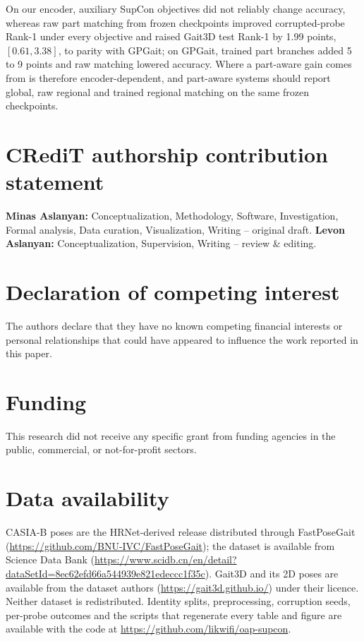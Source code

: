 \documentclass[review,12pt]{elsarticle}
\begin{document}
On our encoder, auxiliary SupCon objectives did not reliably change accuracy,
whereas raw part matching from frozen checkpoints improved corrupted-probe
Rank-1 under every objective and raised Gait3D test Rank-1 by 1.99 points,
$[0.61,3.38]$, to parity with GPGait; on GPGait, trained part branches added 5 to
9 points and raw matching lowered accuracy. Where a part-aware gain comes from
is therefore encoder-dependent, and part-aware systems should report global,
raw regional and trained regional matching on the same frozen checkpoints.

\section*{CRediT authorship contribution statement}
\textbf{Minas Aslanyan:} Conceptualization, Methodology, Software, Investigation,
Formal analysis, Data curation, Visualization, Writing -- original draft.
\textbf{Levon Aslanyan:} Conceptualization, Supervision, Writing -- review \&
editing.

\section*{Declaration of competing interest}
The authors declare that they have no known competing financial interests or
personal relationships that could have appeared to influence the work reported
in this paper.

\section*{Funding}
This research did not receive any specific grant from funding agencies in the
public, commercial, or not-for-profit sectors.

\section*{Data availability}
CASIA-B poses are the HRNet-derived release distributed through FastPoseGait
(\url{https://github.com/BNU-IVC/FastPoseGait}); the dataset is available from
Science Data Bank
(\url{https://www.scidb.cn/en/detail?dataSetId=8ec62efd66a544939e821edeccc1f35c}).
Gait3D and its 2D poses are available from the dataset authors
(\url{https://gait3d.github.io/}) under their licence. Neither dataset is
redistributed. Identity splits, preprocessing, corruption seeds, per-probe
outcomes and the scripts that regenerate every table and figure are available
with the code at \url{https://github.com/likwifi/oap-supcon}.
\end{document}
